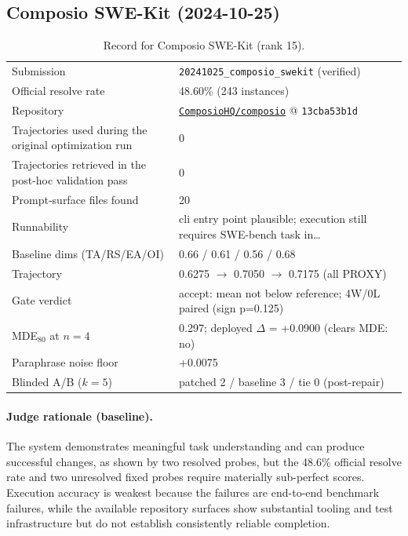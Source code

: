 \subsection{Composio SWE-Kit (2024-10-25)}
\label{app:agent15}
\begin{table}[h]\centering\scriptsize
\caption{Record for Composio SWE-Kit (rank 15).}
\begin{tabular}{lp{8.2cm}}\toprule
Submission & \texttt{20241025\_\allowbreak{}composio\_\allowbreak{}swekit} (verified) \\
Official resolve rate & 48.60\% (243 instances) \\
Repository & \href{https://github.com/ComposioHQ/composio}{\texttt{ComposioHQ/composio}} @ \texttt{13cba53b1d} \\
Trajectories used during the original optimization run & 0 \\
Trajectories retrieved in the post-hoc validation pass & 0 \\
Prompt-surface files found & 20 \\
Runnability & cli entry point plausible; execution still requires SWE-bench task in\ldots{} \\
Baseline dims (TA/RS/EA/OI) & 0.66 / 0.61 / 0.56 / 0.68 \\
Trajectory & 0.6275 $\to$ 0.7050 $\to$ 0.7175 (all PROXY) \\
Gate verdict & accept: mean not below reference; 4W/0L paired (sign p=0.125) \\
MDE$_{80}$ at $n{=}4$ & 0.297; deployed $\Delta$ = +0.0900 (clears MDE: no) \\
Paraphrase noise floor & +0.0075 \\
Blinded A/B ($k{=}5$) & patched 2 / baseline 3 / tie 0 (post-repair) \\
\bottomrule\end{tabular}\end{table}
\paragraph{Judge rationale (baseline).}
The system demonstrates meaningful task understanding and can produce successful changes, as shown by two resolved probes, but the 48.6\% official resolve rate and two unresolved fixed probes require materially sub-perfect scores. Execution accuracy is weakest because the failures are end-to-end benchmark failures, while the available repository surfaces show substantial tooling and test infrastructure but do not establish consistently reliable completion.
